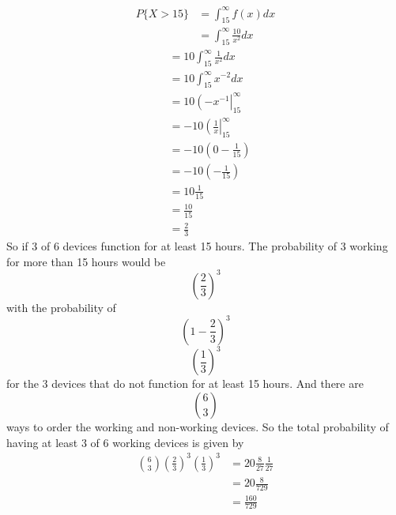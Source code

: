 \documentclass[11pt]{article}
\begin{document}
\begin{enumerate}
\begin{enumerate}[(a)]
\begin{align*}
P\{X>15\} &= \int_{15}^{\infty}f(x)dx\\
&= \int_{15}^{\infty}\frac{10}{x^2}dx
\end{align*}
\begin{align*}
&= 10\int_{15}^{\infty}\frac{1}{x^2}dx\\
&= 10\int_{15}^{\infty}x^{-2}dx\\
&= 10\left(-x^{-1}\right|_{15}^{\infty}\\
&= -10\left(\frac{1}{x}\right|_{15}^{\infty}\\
&= -10\left(0-\frac{1}{15}\right)\\
&= -10\left(-\frac{1}{15}\right)\\
&= 10\frac{1}{15}\\
&= \frac{10}{15}\\
&= \frac{2}{3}
\end{align*}
So if 3 of 6 devices function for at least 15 hours. The probability of 3 working for more than 15 hours would be
$$\left(\frac{2}{3}\right)^3$$
with the probability of
$$\left(1- \frac{2}{3}\right)^3$$
$$\left(\frac{1}{3}\right)^3$$
for the 3 devices that do not function for at least 15 hours. And there are 
$${6\choose3}$$
ways to order the working and non-working devices. So the total probability of having at least 3 of 6 working devices is given by
\begin{align*}
{6\choose3}\left(\frac{2}{3}\right)^3\left(\frac{1}{3}\right)^3 &= 20\frac{8}{27}\frac{1}{27}\\
&= 20\frac{8}{729}\\
&= \frac{160}{729}
\end{align*}
\end{enumerate}


\end{enumerate}
\end{document}
